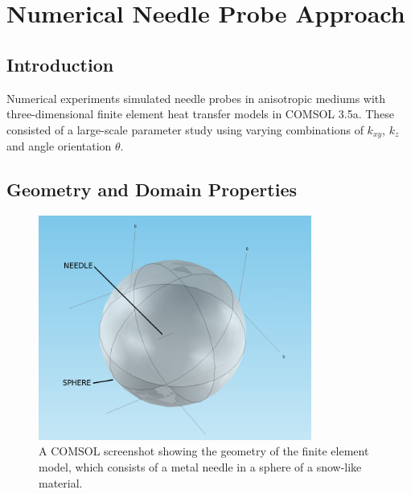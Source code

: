 \chapter{Numerical Needle Probe Approach}
\label{sec:numerical-np}
\bigskip

\section{Introduction} 
\label{sec:numerical-np:introduction}

Numerical experiments simulated needle probes in anisotropic mediums with
three-dimensional finite element heat transfer models in COMSOL 3.5a. These
consisted of a large-scale parameter study using varying combinations of \(k_{xy}\), \(k_z\) and angle orientation \(\theta\).

\section{Geometry and Domain Properties}
\label{sec:numerical-np:domain}

\begin{figure}[h]
\centering
\includegraphics[width=0.8\textwidth]{fig/domain_2.png}
\caption{A COMSOL screenshot showing the geometry of the finite element model, which consists of a metal needle in a sphere of a snow-like material.}
\label{fig:domain}
\end{figure}


